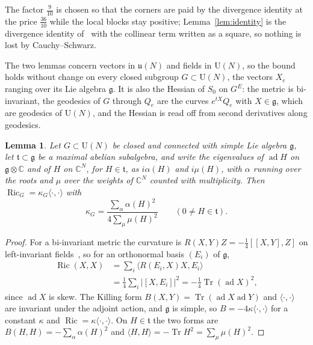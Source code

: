 \documentclass[11pt]{amsart}
\newtheorem{lemma}[theorem]{Lemma}
\theoremstyle{definition}
\theoremstyle{remark}
\numberwithin{equation}{section}
\newcommand{\C}{\mathbb{C}}
\newcommand{\U}{\mathrm{U}}
\newcommand{\g}{\mathfrak{g}}
\newcommand{\Tr}{\operatorname{Tr}}
\newcommand{\Ric}{\operatorname{Ric}}
\newcommand{\ip}[2]{\langle #1,#2\rangle}
\begin{document}
The factor $\frac9{10}$ is chosen so that the corners are paid by the
divergence identity at the price $\frac{36}{10}$ while the local blocks stay
positive; Lemma~\ref{lem:identity} is the divergence identity
of~\cite[Lemma~1]{BB26a} with the collinear term written as a square, so nothing is
lost by Cauchy--Schwarz.

The two lemmas concern vectors in $\mathfrak u(N)$ and fields in $\U(N)$, so the
bound holds without change on every closed subgroup $G\subset\U(N)$, the
vectors $X_e$ ranging over its Lie algebra $\g$. It is also the Hessian of
$S_0$ on $G^E$: the metric is bi-invariant, the geodesics of $G$ through
$Q_e$ are the curves $e^{tX}Q_e$ with $X\in\g$, which are geodesics of
$\U(N)$, and the Hessian is read off from second derivatives along
geodesics.

\begin{lemma}\label{lem:ricci}
Let $G\subset\U(N)$ be closed and connected with simple Lie algebra $\g$, let
$\mathfrak t\subset\g$ be a maximal abelian subalgebra, and write the
eigenvalues of $\operatorname{ad}H$ on $\g\otimes\C$ and of $H$ on $\C^N$, for
$H\in\mathfrak t$, as $i\alpha(H)$ and $i\mu(H)$, with $\alpha$ running over the
roots and $\mu$ over the weights of $\C^N$ counted with multiplicity. Then
$\Ric_G=\kappa_G\ip\cdot\cdot$ with
\[
\kappa_G=\frac{\sum_\alpha\alpha(H)^2}{4\sum_\mu\mu(H)^2}\qquad(0\ne H\in\mathfrak t).
\]
\end{lemma}

\begin{proof}
For a bi-invariant metric the curvature is $R(X,Y)Z=-\frac14[[X,Y],Z]$ on
left-invariant fields~\cite[Sect.~7]{Mil76}, so for an orthonormal basis
$(E_i)$ of $\g$,
\[
\begin{split}
\Ric(X,X)&=\sum_i\ip{R(E_i,X)X}{E_i}\\
&=\tfrac14\sum_i|[X,E_i]|^2=-\tfrac14\Tr(\operatorname{ad}X)^2 ,
\end{split}
\]
since $\operatorname{ad}X$ is skew. The Killing form $B(X,Y)=\Tr(\operatorname{ad}X
\operatorname{ad}Y)$ and $\ip\cdot\cdot$ are invariant under the adjoint
action, and $\g$ is simple, so $B=-4\kappa\ip\cdot\cdot$ for a constant
$\kappa$ and $\Ric=\kappa\ip\cdot\cdot$. On $H\in\mathfrak t$ the two forms
are $B(H,H)=-\sum_\alpha\alpha(H)^2$ and $\ip HH=-\Tr H^2=\sum_\mu\mu(H)^2$.
\end{proof}
\end{document}
